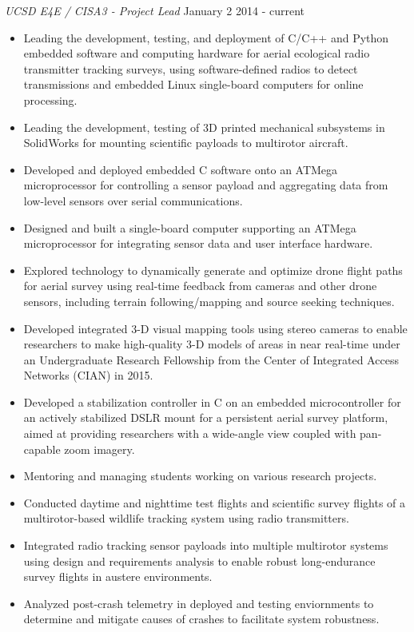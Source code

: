 \documentclass[line,margin]{res}
\begin{document}
\begin{resume}
	{\sl UCSD E4E / CISA3 - Project Lead} \hfill January 2 2014 - current
	\begin{itemize}
		\item Leading the development, testing, and deployment of C/C++ and Python embedded software and computing hardware for aerial ecological radio transmitter tracking surveys, using software-defined radios to detect transmissions and embedded Linux single-board computers for online processing.
		\item Leading the development, testing of 3D printed mechanical subsystems in SolidWorks for mounting scientific payloads to multirotor aircraft.
		\item Developed and deployed embedded C software onto an ATMega microprocessor for controlling a sensor payload and aggregating data from low-level sensors over serial communications.
		\item Designed and built a single-board computer supporting an ATMega microprocessor for integrating sensor data and user interface hardware.
		\item Explored technology to dynamically generate and optimize drone flight paths for aerial survey using real-time feedback from cameras and other drone sensors, including terrain following/mapping and source seeking techniques.
		\item Developed integrated 3-D visual mapping tools using stereo cameras to enable researchers to make high-quality 3-D models of areas in near real-time under an Undergraduate Research Fellowship from the Center of Integrated Access Networks (CIAN) in 2015.
		\item Developed a stabilization controller in C on an embedded microcontroller for an actively stabilized DSLR mount for a persistent aerial survey platform, aimed at providing researchers with a wide-angle view coupled with pan-capable zoom imagery.
		\item Mentoring and managing students working on various research projects.
		\item Conducted daytime and nighttime test flights and scientific survey flights of a multirotor-based wildlife tracking system using radio transmitters.
		\item Integrated radio tracking sensor payloads into multiple multirotor systems using design and requirements analysis to enable robust long-endurance survey flights in austere environments.
		\item Analyzed post-crash telemetry in deployed and testing enviornments to determine and mitigate causes of crashes to facilitate system robustness.

\end{itemize}
\end{resume}
\end{document}
